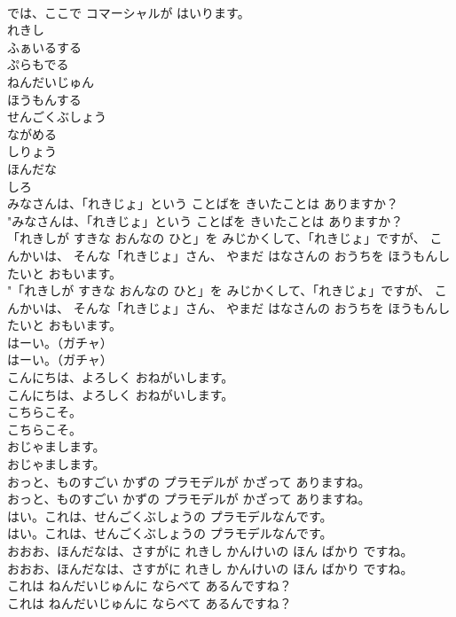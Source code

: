 \documentclass[8pt]{extreport}
\begin{document}
\begin{CJK}{UTF8}{min}
\\	では、ここで コマーシャルが はいります。 
\\	れきし
\\	ふぁいるする
\\	ぷらもでる
\\	ねんだいじゅん
\\	ほうもんする
\\	せんごくぶしょう
\\	ながめる
\\	しりょう
\\	ほんだな
\\	しろ
\\	みなさんは、「れきじょ」という ことばを きいたことは ありますか？	
\\	"みなさんは、「れきじょ」という ことばを きいたことは ありますか？ 
\\	「れきしが すきな おんなの ひと」を みじかくして、「れきじょ」ですが、 こんかいは、 そんな「れきじょ」さん、 やまだ はなさんの おうちを ほうもんしたいと おもいます。	
\\	"「れきしが すきな おんなの ひと」を みじかくして、「れきじょ」ですが、 こんかいは、 そんな「れきじょ」さん、 やまだ はなさんの おうちを ほうもんしたいと おもいます。 
\\	はーい。（ガチャ）	
\\	はーい。（ガチャ） 
\\	こんにちは、よろしく おねがいします。	
\\	こんにちは、よろしく おねがいします。 
\\	こちらこそ。	
\\	こちらこそ。 
\\	おじゃまします。	
\\	おじゃまします。 
\\	おっと、ものすごい かずの プラモデルが かざって ありますね。	
\\	おっと、ものすごい かずの プラモデルが かざって ありますね。 
\\	はい。これは、せんごくぶしょうの プラモデルなんです。	
\\	はい。これは、せんごくぶしょうの プラモデルなんです。 
\\	おおお、ほんだなは、さすがに れきし かんけいの ほん ばかり ですね。	
\\	おおお、ほんだなは、さすがに れきし かんけいの ほん ばかり ですね。 
\\	これは ねんだいじゅんに ならべて あるんですね？	
\\	これは ねんだいじゅんに ならべて あるんですね？ 

\end{CJK}
\end{document}
